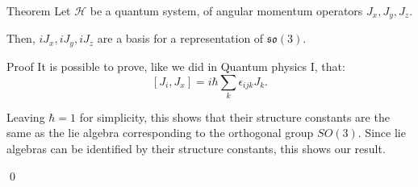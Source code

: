 \documentclass[a4paper]{article}
\begin{document}
\begin{parag}{Theorem}
    Let $\mathcal{H}$ be a quantum system, of angular momentum operators $J_x, J_y, J_z$.

    Then, $i J_x, i J_y, i J_z$ are a basis for a representation of $\mathfrak{so}\left(3\right)$.

    \begin{subparag}{Proof}
        It is possible to prove, like we did in Quantum physics I, that: 
        \[\left[J_i, J_x\right] = i \hbar \sum_{k} \epsilon_{ijk} J_k.\]

        Leaving $\hbar = 1$ for simplicity, this shows that their structure constants are the same as the lie algebra corresponding to the orthogonal group $SO\left(3\right)$. Since lie algebras can be identified by their structure constants, this shows our result.

        \qed
    \end{subparag}
\end{parag}
\end{document}

